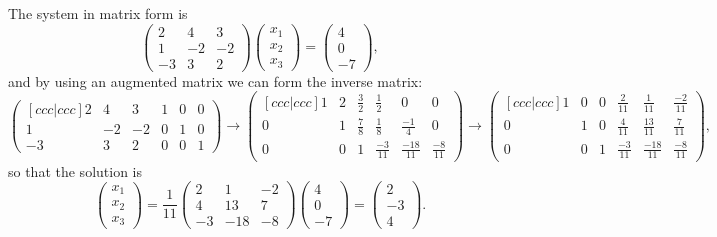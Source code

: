 \documentclass[11pt]{article}
\begin{document}
\begin{enumerate}
    The system in matrix form is \[\begin{pmatrix}
        2 & 4 & 3\\
        1 & -2 & -2\\
        -3 & 3 & 2
    \end{pmatrix}\begin{pmatrix}
        x_1\\x_2\\x_3
    \end{pmatrix} = \begin{pmatrix}
        4\\0\\-7
    \end{pmatrix},\] and by using an augmented matrix we can form the inverse matrix:
    \begin{equation*}
        \begin{pmatrix}[ccc|ccc]
            2 & 4 & 3  &  1 & 0 & 0\\
            1 & -2 & -2  &  0 & 1 & 0\\
            -3 & 3 & 2  &  0 & 0 & 1
        \end{pmatrix}\to \begin{pmatrix}[ccc|ccc]
            1 & 2 & \frac{3}{2}  &  \frac{1}{2} & 0 & 0\\
            0 & 1 & \frac{7}{8}  &  \frac{1}{8} & \frac{-1}{4} & 0\\
            0 & 0 & 1  &  \frac{-3}{11} & \frac{-18}{11} & \frac{-8}{11}
        \end{pmatrix} \to \begin{pmatrix}[ccc|ccc]
            1 & 0 & 0  &  \frac{2}{11} & \frac{1}{11} & \frac{-2}{11}\\
            0 & 1 & 0  &  \frac{4}{11} & \frac{13}{11} & \frac{7}{11}\\
            0 & 0 & 1  &  \frac{-3}{11} & \frac{-18}{11} & \frac{-8}{11}
        \end{pmatrix},
    \end{equation*} so that the solution is \begin{equation*}
        \begin{pmatrix}
            x_1\\x_2\\x_3
        \end{pmatrix} = \frac{1}{11}\begin{pmatrix}
            2 & 1 & -2\\
            4 & 13 & 7\\
            -3 & -18 & -8
        \end{pmatrix}\begin{pmatrix}
            4\\0\\-7
        \end{pmatrix} = \begin{pmatrix}
            2\\-3\\4
        \end{pmatrix}.
    \end{equation*}
\end{enumerate}
\end{document}
